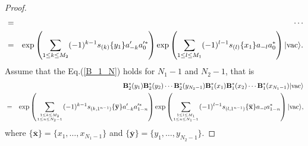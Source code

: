 \documentclass[11pt,reqno]{amsart}
\numberwithin{equation}{section}
\begin{document}
\begin{proof}
\begin{eqnarray}
&=&\cdots\notag\\
&=&\exp\left(\sum\limits_{1\leq k\leq M_{2}}(-1)^{k-1}s_{(k)}\{y_{1}\}a^{\prime}_{-k}a^{\prime\ast}_{0}\right)
\exp\left(\sum\limits_{1\leq l\leq M_{1}}(-1)^{l-1}s_{(l)}\{x_{1}\}a_{-l}a^{\ast}_{0}\right)|\text{vac}\rangle.
\end{eqnarray}
Assume that the Eq.(\ref{B_1_N}) holds for $N_{1}-1$ and $N_{2}-1$, that is
\begin{eqnarray}
&&\mathbf{B}^{\ast}_{2}(y_{1})\mathbf{B}^{\ast}_{2}(y_{2})\cdots
\mathbf{B}^{\ast}_{2}(y_{N_{2}-1})\mathbf{B}^{\ast}_{1}(x_{1})
\mathbf{B}^{\ast}_{1}(x_{2})\cdots\mathbf{B}^{\ast}_{1}(x_{N_{1}-1})|\text{vac}\rangle\notag\\
&=&\exp\left(\sum\limits_{1\leq k\leq M_{2}\atop{1\leq n\leq N_{2}-1}}(-1)^{k-1}s_{(k,1^{n-1})}\{\mathbf{\overline{y}}\}a^{\prime}_{-k}
a^{\prime\ast}_{1-n}\right)
\exp\left(\sum\limits_{1\leq l\leq M_{1}\atop{1\leq n\leq N_{1}-1}}(-1)^{l-1}s_{(l,1^{n-1})}\{\mathbf{\overline{x}}\}a_{-l}a^{\ast}_{1-n}\right)|\text{vac}\rangle,
\notag\\
\end{eqnarray}
where $\{\mathbf{\overline{x}}\}=\{x_1,\ldots,x_{N_{1}-1}\}$ and $\{\mathbf{\overline{y}}\}=\{y_1,\ldots,y_{N_{2}-1}\}$.


\end{proof}
\end{document}

